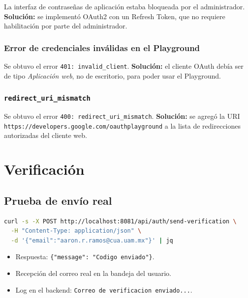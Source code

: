 La interfaz de contraseñas de aplicación estaba bloqueada por el administrador. \textbf{Solución:} se implementó OAuth2 con un Refresh Token, que no requiere habilitación por parte del administrador.

\subsubsection{Error de credenciales inválidas en el Playground}

Se obtuvo el error \texttt{401: invalid\_client}. \textbf{Solución:} el cliente OAuth debía ser de tipo \textit{Aplicación web}, no de escritorio, para poder usar el Playground.

\subsubsection{\texttt{redirect\_uri\_mismatch}}

Se obtuvo el error \texttt{400: redirect\_uri\_mismatch}. \textbf{Solución:} se agregó la URI \texttt{https://developers.google.com/oauthplayground} a la lista de redirecciones autorizadas del cliente web.

\section{Verificación}

\subsection{Prueba de envío real}

\begin{lstlisting}[language=bash]
curl -s -X POST http://localhost:8081/api/auth/send-verification \
  -H "Content-Type: application/json" \
  -d '{"email":"aaron.r.ramos@cua.uam.mx"}' | jq
\end{lstlisting}

\begin{exito}
\begin{itemize}[leftmargin=*]
  \item Respuesta: \texttt{\{"message": "Codigo enviado"\}}.
  \item Recepción del correo real en la bandeja del usuario.
  \item Log en el backend: \texttt{Correo de verificacion enviado...}.
\end{itemize}
\end{exito}


